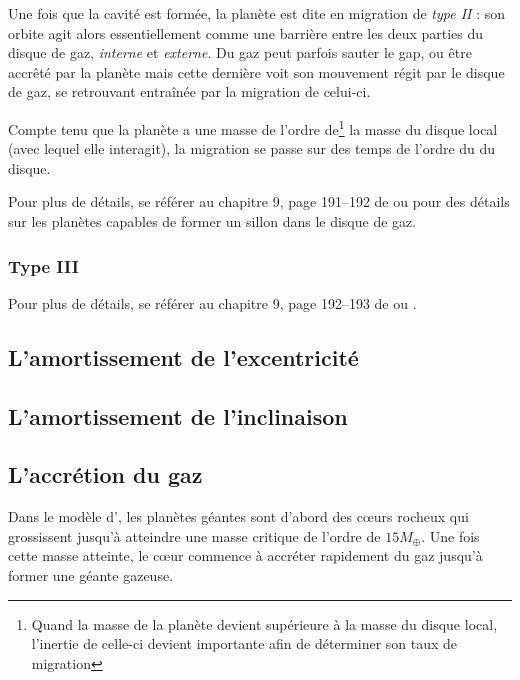 Une fois que la cavité est formée, la planète est dite en migration de \emph{type II} : son orbite agit alors essentiellement comme une barrière entre les deux parties du disque de gaz, \emph{interne} et \emph{externe}. Du gaz peut parfois sauter le gap, ou être accrêté par la planète mais cette dernière voit son mouvement régit par le disque de gaz, se retrouvant entraînée par la migration de celui-ci.

Compte tenu que la planète a une masse de l'ordre de\footnote{Quand la masse de la planète devient supérieure à la masse du disque local, l'inertie de celle-ci devient importante afin de déterminer son taux de migration} la masse du disque local (avec lequel elle interagit), la migration se passe sur des temps de l'ordre du  du disque.

\begin{remarque}
Pour plus de détails, se référer au chapitre 9, page 191--192 de \cite{barnes2010formation} ou \cite{lin1986tidal} pour des détails sur les planètes capables de former un sillon dans le disque de gaz.
\end{remarque}
\subsubsection{Type III}


\begin{remarque}
Pour plus de détails, se référer au chapitre 9, page 192--193 de \cite{barnes2010formation} ou \cite{masset2003runaway}.
\end{remarque}

\subsection{L'amortissement de l'excentricité}%

\subsection{L'amortissement de l'inclinaison}%

\subsection{L'accrétion du gaz}\label{sec:accretion_coeur}
Dans le modèle d', les planètes géantes sont d'abord des c\oe urs rocheux qui grossissent jusqu'à atteindre une masse critique de l'ordre de $15 M_{\oplus}$. Une fois cette masse atteinte, le c\oe ur commence à accréter rapidement du gaz jusqu'à former une géante gazeuse.

